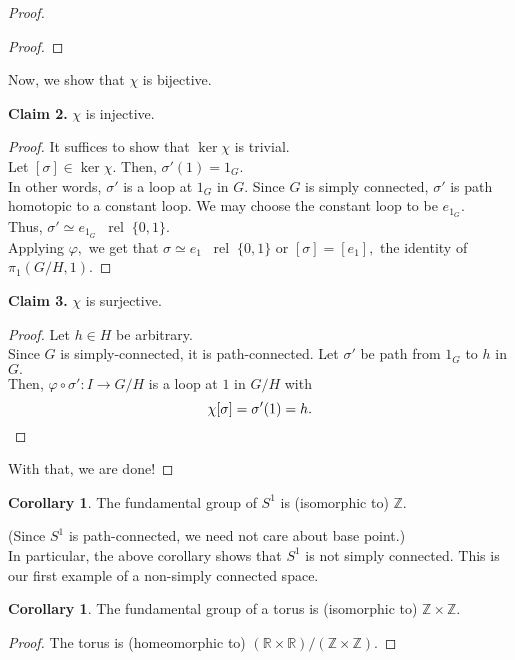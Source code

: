 \documentclass[12pt]{article}
\theoremstyle{definition}
\numberwithin{thm}{section}
\newtheorem{cor}[thm]{Corollary}
\newcommand{\rel}{\;\;\operatorname{rel}\;}
\newenvironment{blockquote}
{\begin{mdframed}[skipabove=0pt, skipbelow=0pt, innertopmargin=4pt, innerbottommargin=4pt, bottomline=false,topline=false,rightline=false, linewidth=2pt]}
{\end{mdframed}}
\begin{document}
\begin{proof}
\begin{blockquote}
\begin{proof}
		\end{proof}
	\end{blockquote}
	Now, we show that $\chi$ is bijective.
	\begin{blockquote}
		\textbf{Claim 2.} $\chi$ is injective.
		\begin{proof} 
			It suffices to show that $\ker \chi$ is trivial.\\
			Let $[\sigma] \in \ker\chi.$ Then, $\sigma'(1) = 1_G.$\\
			In other words, $\sigma'$ is a loop at $1_G$ in $G.$ Since $G$ is simply connected, $\sigma'$ is path homotopic to a constant loop. We may choose the constant loop to be $e_{1_G}.$\\
			Thus, $\sigma' \simeq e_{1_G} \rel \{0, 1\}.$\\
			Applying $\varphi,$ we get that $\sigma \simeq e_1 \rel \{0, 1\}$ or $[\sigma] = [e_1],$ the identity of $\pi_1(G/H, 1).$	
		\end{proof}
	\end{blockquote}
	\begin{blockquote}
		\textbf{Claim 3.} $\chi$ is surjective.	
		\begin{proof} 
			Let $h \in H$ be arbitrary.\\
			Since $G$ is simply-connected, it is path-connected. Let $\sigma'$ be path from $1_G$ to $h$ in $G.$\\
			Then, $\varphi\circ\sigma':I\to G/H$ is a loop at $1$ in $G/H$ with
			\begin{equation*} 
				\chi[\sigma] = \sigma'(1) = h. \qedhere
			\end{equation*}
		\end{proof}
	\end{blockquote}
	With that, we are done!
\end{proof}
\begin{cor}
	The fundamental group of $S^1$ is (isomorphic to) $\mathbb{Z}.$
\end{cor}
(Since $S^1$ is path-connected, we need not care about base point.)\\
In particular, the above corollary shows that $S^1$ is not simply connected. This is our first example of a non-simply connected space.
\begin{cor}
	The fundamental group of a torus is (isomorphic to) $\mathbb{Z} \times \mathbb{Z}.$
\end{cor}
\begin{proof} 
	The torus is (homeomorphic to) $(\mathbb{R} \times \mathbb{R})/(\mathbb{Z} \times \mathbb{Z}).$
\end{proof}
\end{document}
